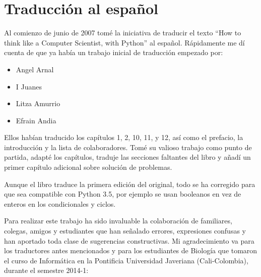 


\chapter{Traducción al español}


Al comienzo de junio de 2007 tomé la iniciativa de traducir el texto 
``How to think like a Computer Scientist, with Python'' al español. Rápidamente
me dí cuenta de que ya había un trabajo inicial de traducción empezado por:

\begin{itemize}
	\item Angel Arnal
	\item I Juanes
	\item Litza Amurrio
	\item Efrain Andia
\end{itemize}

Ellos habían traducido los capítulos 1, 2, 10, 11, y 12, así como el prefacio,
la introducción y la lista de colaboradores. Tomé su valioso trabajo como
punto de partida, adapté los capítulos, traduje las secciones faltantes 
del libro y añadí un primer capítulo adicional sobre solución de problemas.

Aunque el libro traduce la primera edición del original,
todo se ha corregido para que sea compatible con Python 3.5,
por ejemplo se usan booleanos en vez de enteros en los 
condicionales y ciclos. 

Para realizar este trabajo ha sido invaluable la colaboración de familiares, 
colegas, amigos y estudiantes que han señalado errores, expresiones confusas y 
han aportado toda clase de sugerencias constructivas. Mi agradecimiento va para 
los traductores antes mencionados y para los estudiantes de Biología que 
tomaron el curso de Informática en la Pontificia Universidad Javeriana 
(Cali-Colombia), durante el semestre 2014-1:

